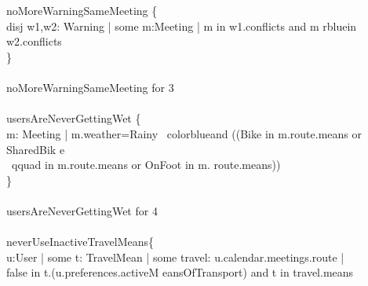 {        \qquad \\
        \\
         noMoreWarningSameMeeting \{ \\
        \qquad \- disj w1,w2: Warning | {\color{b                                                 lue}some} m:Meeting | m {\color{blue}in} w1.conflicts {\color{blue}and} m {\colo                                                 r{blue}in} w2.conflicts\\
        \qquad \}\\
        \qquad \\
         noMoreWarningSameMeeting {\color{blue                                                 }for} 3\\
        \qquad \\
         usersAreNeverGettingWet \{\\
        \qquad \- m: Meeting | m.weather=Rainy {\                                                 color{blue}and} ((Bike {\color{blue}in} m.route.means {\color{blue}or} SharedBik                                                 e \\
        \qquad \-\qquad \-\qquad \-\qquad \-\qquad \-\qquad \-\qquad \-\                                                 qquad {\color{blue}in} m.route.means {\color{blue}or} OnFoot {\color{blue}in} m.                                                 route.means))\\
        \qquad \}\\
        \qquad \\
         usersAreNeverGettingWet {\color{blue}                                                 for} 4\\
        \qquad \\
         neverUseInactiveTravelMeans\{\\
        \qquad  \- u:User | {\color{blue}some} t:                                                 TravelMean | {\color{blue}some} travel: u.calendar.meetings.route |\\
        \qquad \-\qquad  false {\color{blue}in} t.(u.preferences.activeM                                                 eansOfTransport) {\color{blue}and} t {\color{blue}in} travel.means\\
}
